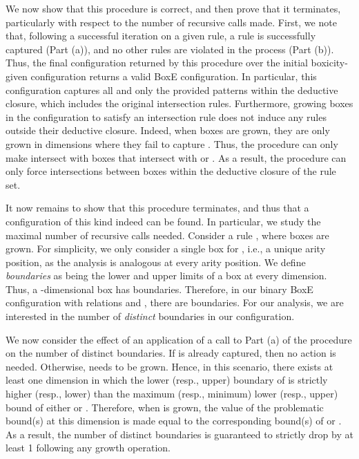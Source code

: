 \documentclass{article}
\begin{document}
We now show that this procedure is correct, and then prove that it terminates, particularly with respect to the number of recursive calls made. First, we note that, following a successful iteration on a given rule, a rule is successfully captured (Part (a)), and no other rules are violated in the process (Part (b)). Thus, the final configuration returned by this procedure over the initial boxicity-given configuration returns a valid BoxE configuration. In particular, this configuration captures all and only the provided patterns within the deductive closure, which includes the original intersection rules. Furthermore, growing  boxes in the configuration to satisfy an intersection rule does not induce any rules outside their deductive closure. Indeed, when  boxes are grown, they are only grown in dimensions where they fail to capture . Thus, the procedure can only make  intersect with boxes that intersect with  or . As a result, the procedure can only force intersections between boxes within the deductive closure of the rule set. 

It now remains to show that this procedure terminates, and thus that a configuration of this kind indeed can be found. In particular, we study the maximal number of recursive calls needed. Consider a rule , where  boxes are grown. For simplicity, we only consider a single box  for , i.e., a unique arity position, as the analysis is analogous at every arity position. We define \emph{boundaries} as being the lower and upper limits of a box at every dimension. Thus, a -dimensional box has  boundaries. Therefore, in our binary BoxE configuration with  relations and , there are  boundaries. For our analysis, we are interested in the number of \emph{distinct} boundaries in our configuration. 

We now consider the effect of an application of a call to Part (a) of the procedure on the number of distinct boundaries. If  is already captured, then no action is needed. Otherwise,  needs to be grown. Hence, in this scenario, there exists at least one dimension in which the lower (resp., upper) boundary of  is strictly higher (resp., lower) than the maximum (resp., minimum) lower (resp., upper) bound of either  or . Therefore, when  is grown, the value of the problematic bound(s) at this dimension is made equal to the corresponding bound(s) of  or . As a result, the number of distinct boundaries is guaranteed to strictly drop by at least 1 following any growth operation. 
\end{document}
